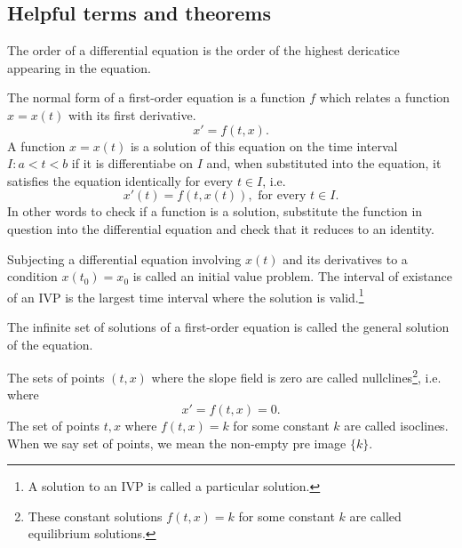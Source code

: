 \documentclass[nobib,notoc]{tufte-handout}
\begin{document}
\subsection{Helpful terms and theorems}
\begin{defi}[Order]
	The order of a differential equation is the order of the highest dericatice appearing in the equation.
\end{defi}
\begin{defi}
	The normal form of a first-order equation is a function \(f\) which relates a function \(x=x(t)\) with its first derivative.
	\begin{equation*}
		x'=f(t,x).
	\end{equation*}
	A function \(x=x(t)\) is a solution of this equation on the time interval \(I:a<t<b\) if it is differentiabe on \(I\) and, when substituted into the equation, it satisfies the equation identically for every \(t\in I\), i.e.
	\begin{equation*}
		x'(t)=f(t,x(t)),\text{ for every }t\in I.
	\end{equation*}
	In other words to check if a function is a solution, substitute the function in question into the differential equation and check that it reduces to an identity.
\end{defi}
\begin{defi}
	Subjecting a differential equation involving \(x(t)\) and its derivatives to a condition \(x(t_0)=x_0\) is called an initial value problem. The interval of existance of an IVP is the largest time interval where the solution is valid.\footnote{A solution to an IVP is called a particular solution.}
\end{defi}
\begin{defi}
	The infinite set of solutions of a first-order equation is called the general solution of the equation.
\end{defi}
\begin{defi}
	The sets of points \((t,x)\) where the slope field is zero are called nullclines\footnote{These constant solutions \(f(t,x)=k\) for some constant \(k\) are called equilibrium solutions.}, i.e. where
	\begin{equation*}
		x'=f(t,x)=0.
	\end{equation*}
	The set of points \(t,x\) where \(f(t,x)=k\) for some constant \(k\) are called isoclines. When we say set of points, we mean the non-empty pre image \(\{k\}\).
\end{defi}
\end{document}
